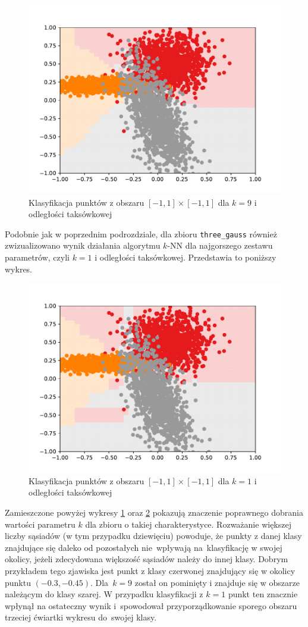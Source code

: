 \documentclass[11pt,a4paper]{article}
\begin{document}
\begin{figure}[H]
  \centering
  \includegraphics[width=.7\textwidth]{res/gauss-manhattan-9.pdf}
  \caption{Klasyfikacja punktów z obszaru $[-1,1] \times [-1,1]$ dla $k = 9$ i odległości taksówkowej}
  \label{fig:gauss-manhattan-9}
\end{figure}

\newpage

Podobnie jak w poprzednim podrozdziale, dla zbioru {\tt three\_gauss} również zwizualizowano wynik działania algorytmu $k$-NN dla najgorszego zestawu parametrów, czyli $k=1$ i odległości taksówkowej. Przedstawia to poniższy wykres.

\begin{figure}[H]
  \centering
  \includegraphics[width=.7\textwidth]{res/gauss-manhattan-1.pdf}
  \caption{Klasyfikacja punktów z obszaru $[-1,1] \times [-1,1]$ dla $k = 1$ i odległości taksówkowej}
  \label{fig:gauss-manhattan-1}
\end{figure}

Zamieszczone powyżej wykresy \ref{fig:gauss-manhattan-9} oraz \ref{fig:gauss-manhattan-1} pokazują znaczenie poprawnego dobrania wartości parametru $k$ dla zbioru o takiej charakterystyce. Rozważanie większej liczby sąsiadów (w tym przypadku dziewięciu) powoduje, że punkty z danej klasy znajdujące się daleko od pozostałych nie~wpływają na~klasyfikację w swojej okolicy, jeżeli zdecydowana większość sąsiadów należy do innej klasy. Dobrym przykładem tego zjawiska jest punkt z klasy czerwonej znajdujący się w okolicy punktu $(-0.3, -0.45)$. Dla~$k=9$ został on pominięty i znajduje się w obszarze należącym do klasy szarej. W przypadku klasyfikacji z $k=1$ punkt ten znacznie wpłynął na ostateczny wynik i~spowodował przyporządkowanie sporego obszaru trzeciej ćwiartki wykresu do~swojej klasy.
\end{document}
